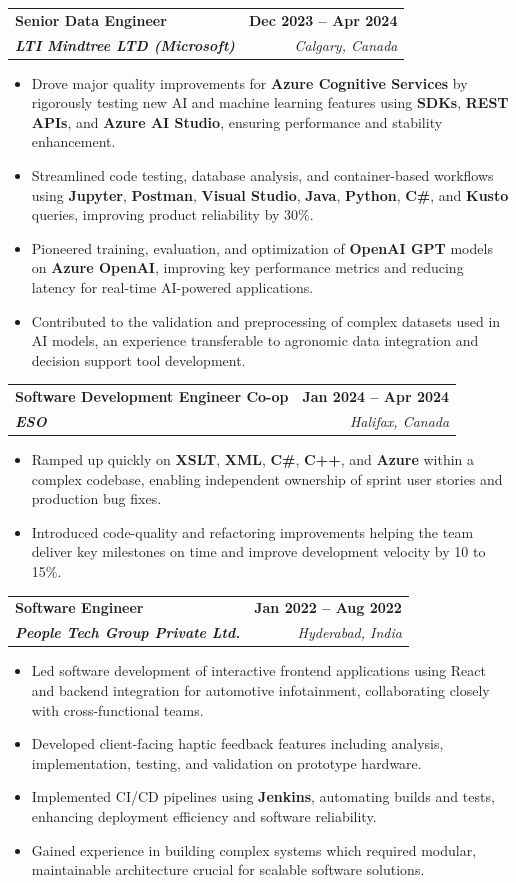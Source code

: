 \documentclass[letterpaper,11pt]{article}
\makeatletter
\newcommand{\resumeItem}[1]{
  \item\small{
    {#1 \vspace{-2pt}}
  }
}
\newcommand{\resumeSubheading}[4]{
  \vspace{-2pt}\item
    \begin{tabular*}{1.0\textwidth}[t]{l@{\extracolsep{\fill}}r}
      \textbf{#1} & \textbf{\small #2} \\
      \textit{\small#3} & \textit{\small #4} \\
    \end{tabular*}\vspace{-7pt}
}
\newcommand{\resumeItemListStart}{\begin{itemize}}
\newcommand{\resumeItemListEnd}{\end{itemize}\vspace{-5pt}}
\makeatother
\begin{document}
    \resumeSubheading
      {\textbf{Senior Data Engineer}}{\textbf{Dec 2023 -- Apr 2024}}
      {\textbf{LTI Mindtree LTD (Microsoft)}}{Calgary, Canada}
      \resumeItemListStart
        \resumeItem{Drove major quality improvements for \textbf{Azure Cognitive Services} by rigorously testing new AI and machine learning features using \textbf{SDKs}, \textbf{REST APIs}, and \textbf{Azure AI Studio}, ensuring performance and stability enhancement.}
        \resumeItem{Streamlined code testing, database analysis, and container-based workflows using \textbf{Jupyter}, \textbf{Postman}, \textbf{Visual Studio}, \textbf{Java}, \textbf{Python}, \textbf{C\#}, and \textbf{Kusto} queries, improving product reliability by 30\%.}
        \resumeItem{Pioneered training, evaluation, and optimization of \textbf{OpenAI GPT} models on \textbf{Azure OpenAI}, improving key performance metrics and reducing latency for real-time AI-powered applications.}
        \resumeItem{Contributed to the validation and preprocessing of complex datasets used in AI models, an experience transferable to agronomic data integration and decision support tool development.}
      \resumeItemListEnd
    
    \resumeSubheading
      {\textbf{Software Development Engineer Co-op}}{\textbf{Jan 2024 -- Apr 2024}}
      {\textbf{ESO}}{Halifax, Canada}
      \resumeItemListStart
        \resumeItem{Ramped up quickly on \textbf{XSLT}, \textbf{XML}, \textbf{C\#}, \textbf{C++}, and \textbf{Azure} within a complex codebase, enabling independent ownership of sprint user stories and production bug fixes.}
        \resumeItem{Introduced code-quality and refactoring improvements helping the team deliver key milestones on time and improve development velocity by 10 to 15\%.}
      \resumeItemListEnd

    \resumeSubheading
      {\textbf{Software Engineer}}{\textbf{Jan 2022 -- Aug 2022}}
      {\textbf{People Tech Group Private Ltd.}}{Hyderabad, India}
      \resumeItemListStart
        \resumeItem{Led software development of interactive frontend applications using React and backend integration for automotive infotainment, collaborating closely with cross-functional teams.}
        \resumeItem{Developed client-facing haptic feedback features including analysis, implementation, testing, and validation on prototype hardware.}
        \resumeItem{Implemented CI/CD pipelines using \textbf{Jenkins}, automating builds and tests, enhancing deployment efficiency and software reliability.}
        \resumeItem{Gained experience in building complex systems which required modular, maintainable architecture crucial for scalable software solutions.}
      \resumeItemListEnd
\end{document}
